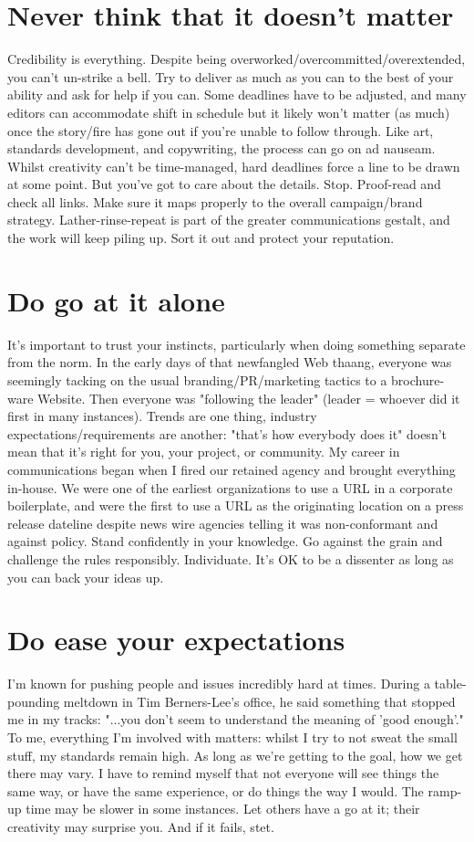\section*{Never think that it doesn't matter}
Credibility is everything. Despite being overworked/overcommitted/overextended,
you can't un-strike a bell. Try to deliver as much as you can to the best of
your ability and ask for help if you can. Some deadlines have to be adjusted,
and many editors can accommodate shift in schedule but it likely won't matter
(as much) once the story/fire has gone out if you're unable to follow through.
Like art, standards development, and copywriting, the process can go on ad
nauseam. Whilst creativity can't be time-managed, hard deadlines force a line to
be drawn at some point. But you've got to care about the details. Stop.
Proof-read and check all links. Make sure it maps properly to the overall
campaign/brand strategy. Lather-rinse-repeat is part of the greater
communications gestalt, and the work will keep piling up. Sort it out and
protect your reputation.

\section*{Do go at it alone}
It's important to trust your instincts, particularly when doing something
separate from the norm. In the early days of that newfangled Web thaang,
everyone was seemingly tacking on the usual branding/PR/marketing tactics to a
brochure-ware Website. Then everyone was "following the leader" (leader = whoever did it first in many instances). Trends are one thing, industry
expectations/requirements are another: "that's how everybody does it" doesn't
mean that it's right for you, your project, or community. My career in
communications began when I fired our retained agency and brought everything
in-house. We were one of the earliest organizations to use a URL in a corporate
boilerplate, and were the first to use a URL as the originating location on a
press release dateline despite news wire agencies telling it was non-conformant
and against policy. Stand confidently in your knowledge. Go against the grain
and challenge the rules responsibly. Individuate. It's OK to be a dissenter as
long as you can back your ideas up.

\section*{Do ease your expectations}
I'm known for pushing people and issues incredibly hard at times. During a
table-pounding meltdown in Tim Berners-Lee's office, he said something that
stopped me in my tracks: "...you don't seem to understand the meaning of 'good
enough'." To me, everything I’m involved with matters: whilst I try to not sweat
the small stuff, my standards remain high. As long as we're getting to the goal,
how we get there may vary. I have to remind myself that not everyone will see
things the same way, or have the same experience, or do things the way I would.
The ramp-up time may be slower in some instances. Let others have a go at it;
their creativity may surprise you. And if it fails, stet.

